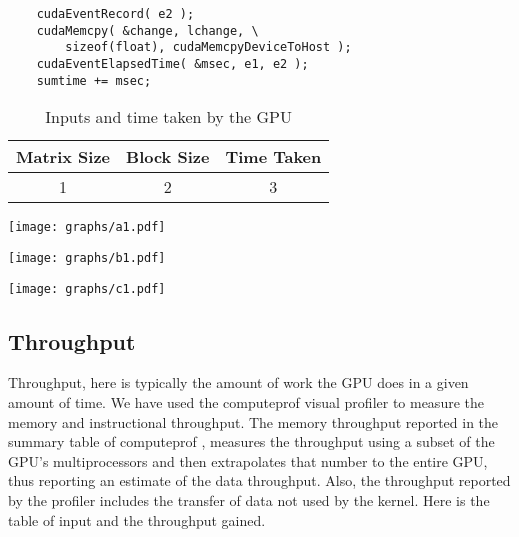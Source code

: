 \documentclass[10pt]{article}
\makeatletter
\newenvironment{figurehere}
    {\def\@captype{figure}}
    {}
\makeatother
\begin{document}
\begin{multicols}{2}
\begin{enumerate}
    \begin{verbatim}
    cudaEventRecord( e2 );
    cudaMemcpy( &change, lchange, \
        sizeof(float), cudaMemcpyDeviceToHost );
    cudaEventElapsedTime( &msec, e1, e2 );
    sumtime += msec;
    \end{verbatim}

    \end{enumerate}

    \begin{table}\footnotesize
    \centering
        \begin{tabular}{ | c | c | c | }
        \hline
        Matrix Size & Block Size & Time Taken \\
        \hline
        1 & 2 & 3 \\
        \hline
        \end{tabular}
        \caption{Inputs and time taken by the GPU}
        \label{tab:inputs_time_taken}
    \end{table}

    \begin{center}
    \begin{figurehere}
        \texttt{[image: graphs/a1.pdf]}
        \caption{}
        \label{fig:time_taken1}
    \end{figurehere}
    \end{center}
    
    \begin{center}
    \begin{figurehere}
        \texttt{[image: graphs/b1.pdf]}
        \caption{}
        \label{fig:time_taken2}
    \end{figurehere}
    \end{center}

    \begin{center}
    \begin{figurehere}
        \texttt{[image: graphs/c1.pdf]}
        \caption{}
        \label{fig:time_taken3}
    \end{figurehere}
    \end{center}

    \subsection{Throughput}
    Throughput, here is typically the amount of work the GPU does in a given amount of time.
    We have used the computeprof visual profiler to measure the memory and instructional throughput.
    The memory throughput reported in the summary table of computeprof ,  measures  the throughput using a subset of the GPU’s multiprocessors and then extrapolates that number to the entire GPU, thus reporting an estimate of the data throughput.
    Also, the throughput reported by the profiler includes the transfer of data not used by the kernel.
    Here is the table of input and the throughput gained.


\end{multicols}
\end{document}
